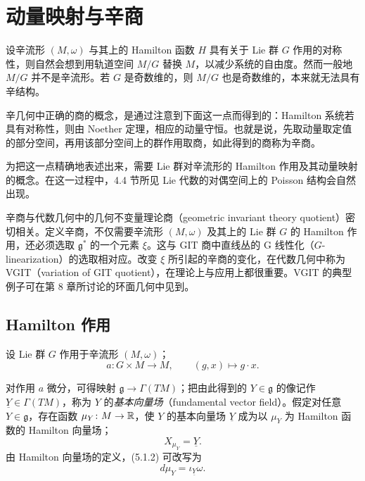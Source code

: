 \chapter{动量映射与辛商}

设辛流形 $(M,\omega)$ 与其上的 Hamilton 函数 $H$ 具有关于 Lie 群 $G$ 作用的对称性，则自然会想到用轨道空间 $M/G$ 替换 $M$，以减少系统的自由度。然而一般地 $M/G$ 并不是辛流形。若 $G$ 是奇数维的，则 $M/G$ 也是奇数维的，本来就无法具有辛结构。

辛几何中正确的商的概念，是通过注意到下面这一点而得到的：Hamilton 系统若具有对称性，则由 Noether 定理，相应的动量守恒。也就是说，先取动量取定值的部分空间，再用该部分空间上的群作用取商，如此得到的商称为辛商。

为把这一点精确地表述出来，需要 Lie 群对辛流形的 Hamilton 作用及其动量映射的概念。在这一过程中，4.4 节所见 Lie 代数的对偶空间上的 Poisson 结构会自然出现。

辛商与代数几何中的几何不变量理论商（geometric invariant theory quotient）密切相关。定义辛商，不仅需要辛流形 $(M,\omega)$ 及其上的 Lie 群 $G$ 的 Hamilton 作用，还必须选取 $\mathfrak{g}^*$ 的一个元素 $\xi$。这与 GIT 商中直线丛的 G 线性化（$G$-linearization）的选取相对应。改变 $\xi$ 所引起的辛商的变化，在代数几何中称为 VGIT（variation of GIT quotient），在理论上与应用上都很重要。VGIT 的典型例子可在第 8 章所讨论的环面几何中见到。

\section{Hamilton 作用}

设 Lie 群 $G$ 作用于辛流形 $(M,\omega)$；
\begin{equation}
  a\colon G\times M\to M,\qquad (g,x)\mapsto g\cdot x.
  \tag{5.1.1}
\end{equation}

对作用 $a$ 微分，可得映射 $\mathfrak{g}\to\Gamma(TM)$；把由此得到的 $Y\in\mathfrak{g}$ 的像记作 $\underline{Y}\in\Gamma(TM)$，称为 $Y$ 的\emph{基本向量场}（fundamental vector field）。假定对任意 $Y\in\mathfrak{g}$，存在函数 $\mu_Y\colon M\to\mathbb{R}$，使 $Y$ 的基本向量场 $\underline{Y}$ 成为以 $\mu_Y$ 为 Hamilton 函数的 Hamilton 向量场；
\begin{equation}
  X_{\mu_Y}=\underline{Y}.
  \tag{5.1.2}
\end{equation}
由 Hamilton 向量场的定义，(5.1.2) 可改写为
\begin{equation}
  d\mu_Y=\iota_{\underline{Y}}\omega.
  \tag{5.1.3}
\end{equation}

